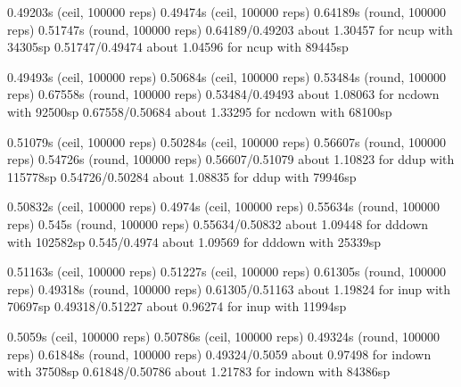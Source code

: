 0.49203s (ceil, 100000 reps)                            0.49474s (ceil, 100000 reps)                           
0.64189s (round, 100000 reps)                           0.51747s (round, 100000 reps)                          
0.64189/0.49203 about 1.30457 for ncup with 34305sp     0.51747/0.49474 about 1.04596 for ncup with 89445sp    
                                                                                                               
0.49493s (ceil, 100000 reps)                            0.50684s (ceil, 100000 reps)                           
0.53484s (round, 100000 reps)                           0.67558s (round, 100000 reps)                          
0.53484/0.49493 about 1.08063 for ncdown with 92500sp   0.67558/0.50684 about 1.33295 for ncdown with 68100sp  
                                                                                                               
0.51079s (ceil, 100000 reps)                            0.50284s (ceil, 100000 reps)                           
0.56607s (round, 100000 reps)                           0.54726s (round, 100000 reps)                          
0.56607/0.51079 about 1.10823 for ddup with 115778sp    0.54726/0.50284 about 1.08835 for ddup with 79946sp    
                                                                                                               
0.50832s (ceil, 100000 reps)                            0.4974s (ceil, 100000 reps)                            
0.55634s (round, 100000 reps)                           0.545s (round, 100000 reps)                            
0.55634/0.50832 about 1.09448 for dddown with 102582sp  0.545/0.4974 about 1.09569 for dddown with 25339sp     
                                                                                                               
0.51163s (ceil, 100000 reps)                            0.51227s (ceil, 100000 reps)                           
0.61305s (round, 100000 reps)                           0.49318s (round, 100000 reps)                          
0.61305/0.51163 about 1.19824 for inup with 70697sp     0.49318/0.51227 about 0.96274 for inup with 11994sp    
                                                                                                               
0.5059s (ceil, 100000 reps)                             0.50786s (ceil, 100000 reps)                           
0.49324s (round, 100000 reps)                           0.61848s (round, 100000 reps)                          
0.49324/0.5059 about 0.97498 for indown with 37508sp    0.61848/0.50786 about 1.21783 for indown with 84386sp  
                                                                                                               
